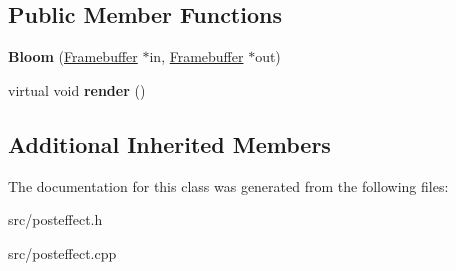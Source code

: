 \subsection*{Public Member Functions}
\begin{DoxyCompactItemize}
\item 
\hypertarget{class_bloom_abfd2a3c58a5a62b8aa49fb953e5081e6}{}{\bfseries Bloom} (\hyperlink{class_framebuffer}{Framebuffer} $\ast$in, \hyperlink{class_framebuffer}{Framebuffer} $\ast$out)\label{class_bloom_abfd2a3c58a5a62b8aa49fb953e5081e6}

\item 
\hypertarget{class_bloom_a7754f494e4a503d4483215912efe6687}{}virtual void {\bfseries render} ()\label{class_bloom_a7754f494e4a503d4483215912efe6687}

\end{DoxyCompactItemize}
\subsection*{Additional Inherited Members}


The documentation for this class was generated from the following files\+:\begin{DoxyCompactItemize}
\item 
src/posteffect.\+h\item 
src/posteffect.\+cpp\end{DoxyCompactItemize}
